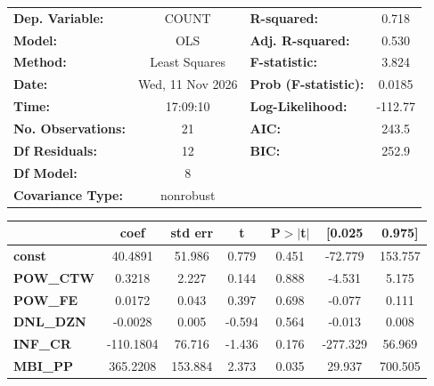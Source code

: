 \begin{center}
\begin{tabular}{lclc}
\toprule
\textbf{Dep. Variable:}    &      COUNT       & \textbf{  R-squared:         } &     0.718   \\
\textbf{Model:}            &       OLS        & \textbf{  Adj. R-squared:    } &     0.530   \\
\textbf{Method:}           &  Least Squares   & \textbf{  F-statistic:       } &     3.824   \\
\textbf{Date:}             & Wed, 11 Nov 2026 & \textbf{  Prob (F-statistic):} &   0.0185    \\
\textbf{Time:}             &     17:09:10     & \textbf{  Log-Likelihood:    } &   -112.77   \\
\textbf{No. Observations:} &          21      & \textbf{  AIC:               } &     243.5   \\
\textbf{Df Residuals:}     &          12      & \textbf{  BIC:               } &     252.9   \\
\textbf{Df Model:}         &           8      & \textbf{                     } &             \\
\textbf{Covariance Type:}  &    nonrobust     & \textbf{                     } &             \\
\bottomrule
\end{tabular}
\begin{tabular}{lcccccc}
                   & \textbf{coef} & \textbf{std err} & \textbf{t} & \textbf{P$> |$t$|$} & \textbf{[0.025} & \textbf{0.975]}  \\
\midrule
\textbf{const}     &      40.4891  &       51.986     &     0.779  &         0.451        &      -72.779    &      153.757     \\
\textbf{POW\_CTW}  &       0.3218  &        2.227     &     0.144  &         0.888        &       -4.531    &        5.175     \\
\textbf{POW\_FE}   &       0.0172  &        0.043     &     0.397  &         0.698        &       -0.077    &        0.111     \\
\textbf{DNL\_DZN}  &      -0.0028  &        0.005     &    -0.594  &         0.564        &       -0.013    &        0.008     \\
\textbf{INF\_CR}   &    -110.1804  &       76.716     &    -1.436  &         0.176        &     -277.329    &       56.969     \\
\textbf{MBI\_PP}   &     365.2208  &      153.884     &     2.373  &         0.035        &       29.937    &      700.505     \\

\end{tabular}
\end{center}
